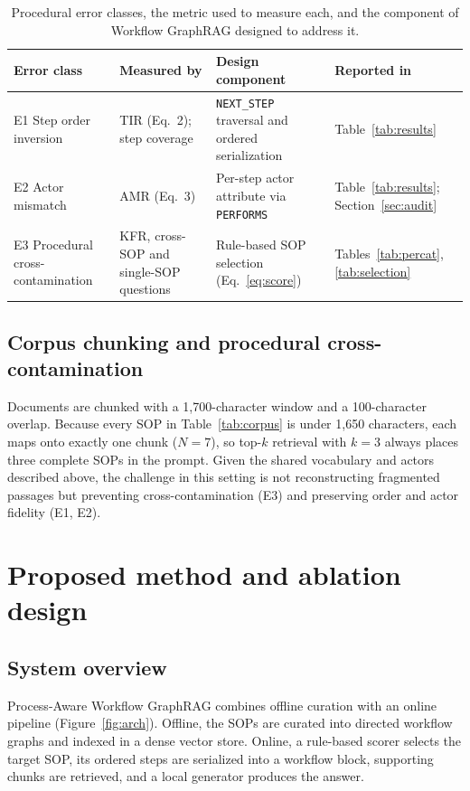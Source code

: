 \documentclass[preprint,10pt]{elsarticle}
\begin{document}
\begin{table}[!htbp]
\centering
\caption{Procedural error classes, the metric used to measure each, and the component of Workflow GraphRAG designed to address it.}
\label{tab:errormap}
\small
\setlength{\tabcolsep}{4pt}
\begin{tabularx}{\textwidth}{>{\raggedright\arraybackslash}p{2.2cm} >{\raggedright\arraybackslash}X >{\raggedright\arraybackslash}p{3.0cm} >{\raggedright\arraybackslash}p{2.0cm}}
\toprule
Error class & Measured by & Design component & Reported in \\
\midrule
E1 Step order inversion & TIR (Eq.~2); step coverage & \texttt{NEXT\_STEP} traversal and ordered serialization & Table~\ref{tab:results} \\
E2 Actor mismatch & AMR (Eq.~3) & Per-step actor attribute via \texttt{PERFORMS} & Table~\ref{tab:results}; Section~\ref{sec:audit} \\
E3 Procedural cross-contamination & KFR, cross-SOP and single-SOP questions & Rule-based SOP selection (Eq.~\eqref{eq:score}) & Tables~\ref{tab:percat}, \ref{tab:selection} \\
\bottomrule
\end{tabularx}
\end{table}

\subsection{Corpus chunking and procedural cross-contamination}
Documents are chunked with a 1,700-character window and a 100-character overlap. Because every SOP in Table~\ref{tab:corpus} is under 1,650 characters, each maps onto exactly one chunk ($N=7$), so top-$k$ retrieval with $k=3$ always places three complete SOPs in the prompt. Given the shared vocabulary and actors described above, the challenge in this setting is not reconstructing fragmented passages but preventing cross-contamination (E3) and preserving order and actor fidelity (E1, E2).

\section{Proposed method and ablation design}
\label{sec:method}

\subsection{System overview}
Process-Aware Workflow GraphRAG combines offline curation with an online pipeline (Figure~\ref{fig:arch}). Offline, the SOPs are curated into directed workflow graphs and indexed in a dense vector store. Online, a rule-based scorer selects the target SOP, its ordered steps are serialized into a workflow block, supporting chunks are retrieved, and a local generator produces the answer.
\end{document}

